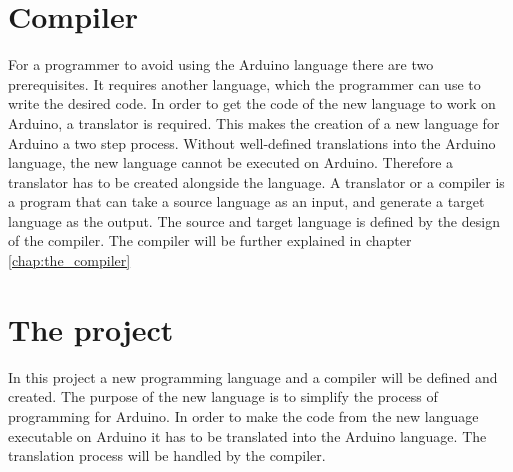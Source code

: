 \section{Compiler}
For a programmer to avoid using the Arduino language there are two prerequisites. It requires another language, which the programmer can use to write the desired code. In order to get the code of the new language to work on Arduino, a translator is required. This makes the creation of a new language for Arduino a two step process. Without well-defined translations into the Arduino language, the new language cannot be executed on Arduino. Therefore a translator has to be created alongside the language.
A translator or a compiler is a program that can take a source language as an input, and generate a target language as the output. The source and target language is defined by the design of the compiler. The compiler will be further explained in chapter \ref{chap:the_compiler} 

\section{The project}
In this project a new programming language and a compiler will be defined and created. The purpose of the new language is to simplify the process of programming for Arduino. In order to make the code from the new language executable on Arduino it has to be translated into the Arduino language. The translation process will be handled by the compiler. 
